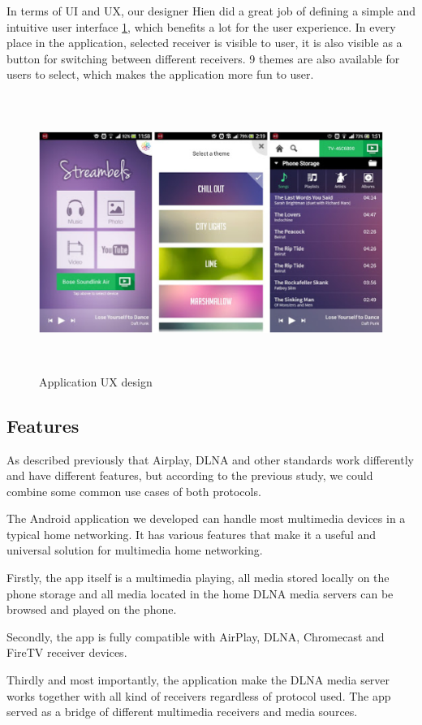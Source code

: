 In terms of UI and UX, our designer Hien did a great job of defining a simple
and intuitive user interface \ref{chart5}, which benefits a lot for the user
experience.
In every place in the application, selected receiver is visible to user, it is also
visible as a button for switching between different receivers. 9 themes are also
available for users to select, which makes the application more fun to user.
\begin{figure}[htb]
\centering \includegraphics[height=9cm]{charts/streambels_ui}
\caption{Application UX design \label{chart5}}
\end{figure}

\subsection{Features}
As described previously that Airplay, DLNA and other standards work
differently and have different features, but according to the previous study,
we could combine some common use cases of both protocols.

The Android application we developed can handle most multimedia devices in 
a typical home networking. It has various features that make it a useful and
universal solution for multimedia home networking.

Firstly, the app itself is a multimedia playing, all media stored locally on the
phone storage and all media located in the home DLNA media servers can be
browsed and played on the phone.

Secondly, the app is fully compatible with AirPlay, DLNA, Chromecast and FireTV
receiver devices. 

Thirdly and most importantly, the application make the DLNA media server works
together with all kind of receivers regardless of protocol used. The app served
as a bridge of different multimedia receivers and media sources.


